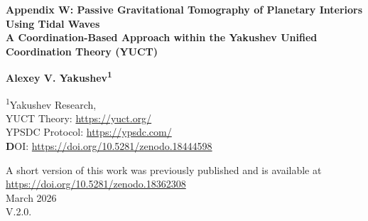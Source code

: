 \documentclass[12pt,a4paper]{article}
\theoremstyle{remark}
\begin{document}
	
	\begin{titlepage}
		\begin{center}
			\vspace*{1cm}
			
			\Huge\textbf{Appendix W: Passive Gravitational Tomography of Planetary Interiors Using Tidal Waves} \\
			\vspace{0.5cm}
			\Large\textbf{A Coordination-Based Approach within the Yakushev Unified Coordination Theory (YUCT)}
			
			\vspace{1.5cm}
			
			\Large\textbf{Alexey V. Yakushev\textsuperscript{1}}
			
			\vspace{0.3cm}
			\large
			\textsuperscript{1}Yakushev Research, \\
				YUCT Theory: \url{https://yuct.org/}\\
			YPSDC Protocol: \url{https://ypsdc.com/}\\
			
			
			\vspace{2cm}
			\textbf DOI: \url{https://doi.org/10.5281/zenodo.18444598}\\
			
			\vspace{1cm}
			
			\vspace{0cm}
			\large 
			A short version of this work was previously published and is available at\\ \url{https://doi.org/10.5281/zenodo.18362308}\\
			\vspace{1cm}
			March 2026 \\ \large V.2.0.
			
			\vspace{2cm}
			

\end{center}
\end{titlepage}
\end{document}
